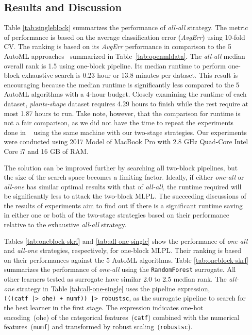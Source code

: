 \documentclass{juliacon}
\begin{document}
\subsection{Results and Discussion}



Table \ref{tab:singleblock} summarizes the performance of \emph{all-all}
strategy. The metric of performance is based on the average classification
error (\emph{AvgErr}) using 10-fold CV. The ranking is based on its
\emph{AvgErr} performance in comparison to the 5 AutoML approaches~\cite{zoller2019} summarized in Table~\ref{tab:openmldata}.
The \emph{all-all} median overall rank is 1.5 using one-block pipeline.
Its median runtime to
perform one-block exhaustive search is 0.23 hour or 13.8 minutes per dataset.
This result is encouraging because the median runtime is significantly less
compared to the 5 AutoML algorithms with a 4-hour budget.  Closely examining 
the runtime of each dataset, \emph{plants-shape} dataset
requires 4.29 hours to finish while
the rest require at most 1.87 hours to run. Take note, however, that the
comparison for runtime is not a fair comparison, as we did not have the time to repeat the experiments done in ~\cite{zoller2019}
using the same machine with our two-stage strategies. Our experiments were conducted using 2017 Model of MacBook Pro with 2.8 GHz Quad-Core Intel Core i7 and 16 GB of RAM.

\vskip 6pt

The solution can be improved further by searching all two-block pipelines,
but the size of the search space becomes a limiting factor. Ideally, if either
\emph{one-all} or \emph{all-one} has similar optimal results with that of
\emph{all-all}, the runtime required will be significantly less to attack
the two-block MLPL.  The succeeding discussions of the results of
experiments aim to find out if there is a significant runtime
saving in either one or both of the two-stage strategies based
on their performance relative to the exhaustive \emph{all-all}
strategy.









Tables \ref{tab:oneblock-skrf} and \ref{tab:all-one-single} show the
performance of \emph{one-all} and \emph{all-one} strategies, respectively, for one-block MLPL. Their ranking is based on their performances against the 5 AutoML algorithms.
Table \ref{tab:oneblock-skrf} summarizes the performance of \emph{one-all}
using the \texttt{RandomForest} surrogate.
All other learners tested as surrogate have similar 2.0 to
2.5 median rank. The \emph{all-one} strategy in Table \ref{tab:all-one-single}
uses the pipeline expression,\texttt{(((catf~|>~ohe)~+~numf))~|>~robustsc},
as the surrogate pipeline to
search for the best learner in the first stage.  The expression indicates
one-hot encoding~(ohe) of the categorical features~(\texttt{catf}) combined
with the numerical features~(\texttt{numf}) and transformed by robust scaling~(\texttt{robustsc}).
\end{document}
